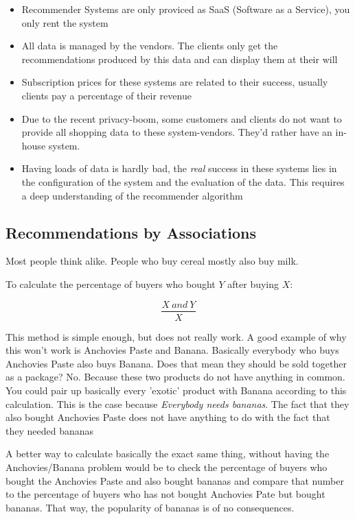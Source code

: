 \documentclass[11pt]{article}
\begin{document}
\begin{itemize}
    \item Recommender Systems are only proviced as SaaS (Software as a Service), you only rent the system
    \item All data is managed by the vendors. The clients only get the recommendations produced by this data and can display them at their will
    \item Subscription prices for these systems are related to their success, usually clients pay a percentage of their revenue
    \item Due to the recent privacy-boom, some customers and clients do not want to provide all shopping data to these system-vendors. They'd rather have an in-house system.
    \item Having loads of data is hardly bad, the \textit{real} success in these systems lies in the configuration of the system and the evaluation of the data. This requires a deep understanding of the recommender algorithm
\end{itemize}

\subsection{Recommendations by Associations}

Most people think alike. People who buy cereal mostly also buy milk.

To calculate the percentage of buyers who bought $Y$ after buying $X$:

\begin{equation}
    \frac{X\ and\ Y}{X}
\end{equation}

This method is simple enough, but does not really work. A good example of why this won't work is Anchovies Paste and Banana. Basically everybody who buys Anchovies Paste also buys Banana. Does that mean they should be sold together as a package? No. Because these two products do not have anything in common. You could pair up basically every 'exotic' product with Banana according to this calculation. This is the case because \textit{Everybody needs bananas}. The fact that they also bought Anchovies Paste does not have anything to do with the fact that they needed bananas

\vspace{10px}

A better way to calculate basically the exact same thing, without having the Anchovies/Banana problem would be to check the percentage of buyers who bought the Anchovies Paste and also bought bananas and compare that number to the percentage of buyers who has not bought Anchovies Pate but bought bananas. That way, the popularity of bananas is of no consequences.
\end{document}
